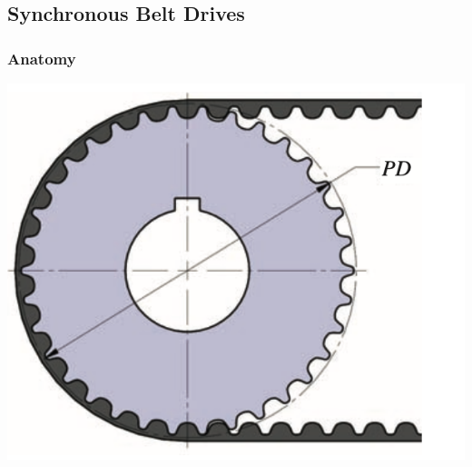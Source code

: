 \documentclass[11pt, fleqn]{article}
\begin{document}
\subsection{Synchronous Belt Drives}
\subsubsection{Anatomy}
\includegraphics[scale=0.6]{Belts/sync-belt_pd.png}
\end{document}
